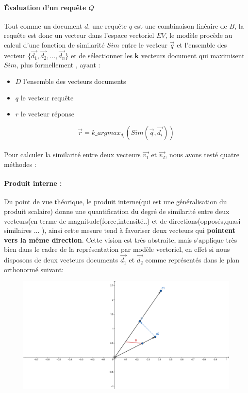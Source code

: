 \documentclass[12pt]{report}
\begin{document}
			\paragraph{Évaluation d'un requête $Q$} 
			Tout comme un document $d$, une requête $q$ est une combinaison linéaire de $B$, la requête 
			est donc un vecteur dans l'espace vectoriel $EV$, le modèle procède au calcul d'une fonction
			de similarité $Sim$ entre le vecteur $\vec{q}$ et l'ensemble des vecteur
			$\lbrace \vec{d_1} , \vec{d_2}, ... , \vec{d_n}\rbrace$ et de sélectionner les \textbf{k} 
			vecteurs document qui maximisent $Sim$, plus formellement , ayant : 
			\begin{itemize}
				\item $D$ l'ensemble des vecteurs documents 
				\item $q$ le vecteur requête
				\item $r$ le vecteur réponse
			\end{itemize}
		
			\[
				\vec{r} = k\_argmax_{d_i} (Sim(\vec{q},\vec{d_i}))
			\]
			
			\paragraph{}
			Pour calculer la similarité entre deux vecteurs $\vec{v_1}$ et $\vec{v_2}$, nous avons testé quatre
			méthodes : 
			
			\paragraph{Produit interne :}
			Du point de vue théorique, le produit interne(qui est une généralisation du produit scalaire) donne
			une quantification du degré de similarité entre deux vecteurs(en terme de magnitude(force,intensité..)
			et de directions(opposés,quasi similaires ... ), ainsi cette mesure tend à favoriser deux vecteurs
			qui \textbf{pointent vers la même direction}. Cette vision est très abstraite, mais s'applique très 
			bien dans le cadre de la représentation par modèle vectoriel, en effet si nous disposons de deux
			vecteurs documents $\vec{d_1}$ et $\vec{d_2}$ comme représentés dans le plan orthonormé suivant: 
			
			\begin{figure}[H]
				\centering
				\includegraphics[width=0.75\linewidth]{images/geogebra-export.png}
			\end{figure}
			
\end{document}
